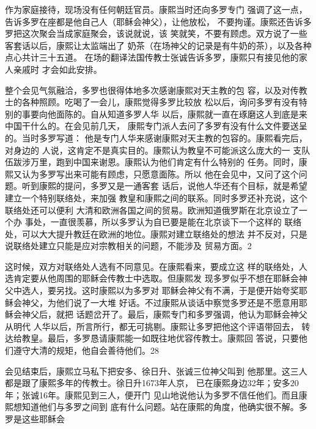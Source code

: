 \par
作为家庭接待，现场没有任何朝廷官员。康熙当时还向多罗专门%
强调了这一点，告诉多罗在座都是他自己人（耶稣会神父），让他放松，%
不要拘谨。康熙还告诉多罗把这次聚会当成家庭聚会，该说就说，该%
笑就笑，不要有顾虑。双方说了一些客套话以后，康熙让太监端出了%
奶茶（在场神父的记录是有牛奶的茶），以及各种点心共计三十五道。%
在场的翻译法国传教士张诚告诉多罗，康熙只有接见他的家人亲戚时%
才会如此安排。%
\par
整个会见气氛融洽，多罗也很得体地多次感谢康熙对天主教的包%
容，以及对传教士的各种照顾。吃喝了一会儿，康熙觉得多罗比较放%
松以后，询问多罗有没有特别的事要向他面陈的。自从知道多罗人华%
以后，康熙就一直在琢磨这人到底是来中国干什么的。在会见前几天，%
康熙专门派人去问了多罗有没有什么文件要送呈的。当时多罗写道：%
他是专门人华来感谢康熙对天主教的包容的。康熙看完后，对身边的%
人说，这肯定不是真实目的。康熙认为教皇不可能派这么庞大的一%
支队伍跋涉万里，跑到中国来谢恩。康熙认为他们肯定有什么特别的%
任务。同时，康熙又认为多罗写出来可能有顾虑，只愿意面陈。所以%
他在会见中，又问了这个问题。听到康熙的提问，多罗又是一通客套%
话后，说他人华还有个目标，就是希望建立一个特别联络处，来加强%
教皇和康熙之间的联系。同时多罗还补充说，这个联络处还可以便利%
大清和欧洲各国之间的贸易。欧洲知道俄罗斯在北京设立了一个办%
事处，一直很羡慕，所以多罗认为自已要是能在北京谈下一个这样的%
联络处，可以大大提升教廷在欧洲的地位。康熙对建立联络处的想法%
并不反对，只是说联络处建立只能是应对宗教相关的问题，不能涉及%
贸易方面。2%
\par
这时候，双方对联络处人选有不同意见。在康熙看来，要成立这%
样的联络处，人选肯定要从他周围的耶稣会传教士中选取。但康熙发%
现多罗似乎不想在耶稣会神父中选人，要另找。这时康熙以为多罗对%
耶稣会神父有不满，于是便开始夸奖耶稣会神父，为他们说了一大堆%
好话。不过康熙从谈话中察觉多罗还是不愿意用耶稣会神父后，就把%
话题岔开了。最后，康熙专门和多罗强调，他认为耶稣会神父从明代%
人华以后，所言所行，都无可挑剔。康熙让多罗把他这个评语带回去，%
转达给教皇。最后，多罗恳请康熙能一如既往地优容传教士。康熙回%
答说，只要他们遵守大清的规矩，他自会善待他们。28%
\par
会见结束后，康熙立马私下把安多、徐日升、张诚三位神父叫到%
他那里。这三人都是跟了康熙多年的传教士。徐日升1673年人京，%
已在康熙身边32年；安多20年；张诚16年。康熙见到三人，便开门%
见山地说他认为多罗不信任他们。而且康熙想知道他们与多罗之间到%
底有什么问题。站在康熙的角度，他确实很不解。多罗是这些耶稣会%
